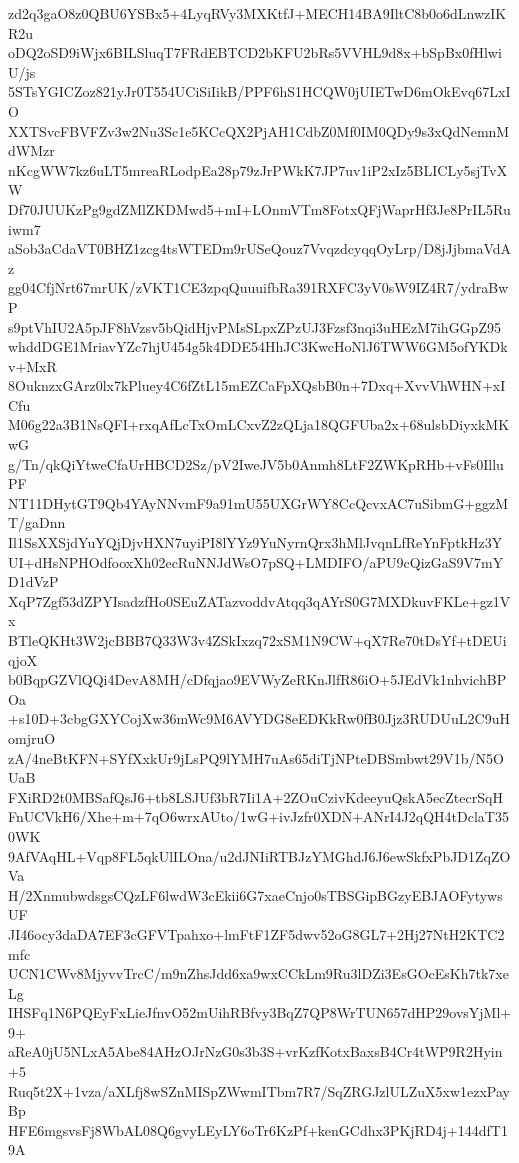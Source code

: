 zd2q3gaO8z0QBU6YSBx5+4LyqRVy3MXKtfJ+MECH14BA9IltC8b0o6dLnwzIKR2u
oDQ2oSD9iWjx6BILSluqT7FRdEBTCD2bKFU2bRs5VVHL9d8x+bSpBx0fHlwiU/js
5STsYGICZoz821yJr0T554UCiSiIikB/PPF6hS1HCQW0jUIETwD6mOkEvq67LxIO
XXTSvcFBVFZv3w2Nu3Sc1e5KCcQX2PjAH1CdbZ0Mf0IM0QDy9s3xQdNemnMdWMzr
nKcgWW7kz6uLT5mreaRLodpEa28p79zJrPWkK7JP7uv1iP2xIz5BLICLy5sjTvXW
Df70JUUKzPg9gdZMlZKDMwd5+mI+LOnmVTm8FotxQFjWaprHf3Je8PrIL5Ruiwm7
aSob3aCdaVT0BHZ1zcg4tsWTEDm9rUSeQouz7VvqzdcyqqOyLrp/D8jJjbmaVdAz
gg04CfjNrt67mrUK/zVKT1CE3zpqQuuuifbRa391RXFC3yV0sW9IZ4R7/ydraBwP
s9ptVhIU2A5pJF8hVzsv5bQidHjvPMsSLpxZPzUJ3Fzsf3nqi3uHEzM7ihGGpZ95
whddDGE1MriavYZc7hjU454g5k4DDE54HhJC3KwcHoNlJ6TWW6GM5ofYKDkv+MxR
8OuknzxGArz0lx7kPluey4C6fZtL15mEZCaFpXQsbB0n+7Dxq+XvvVhWHN+xICfu
M06g22a3B1NsQFI+rxqAfLcTxOmLCxvZ2zQLja18QGFUba2x+68ulsbDiyxkMKwG
g/Tn/qkQiYtweCfaUrHBCD2Sz/pV2IweJV5b0Anmh8LtF2ZWKpRHb+vFs0IlluPF
NT11DHytGT9Qb4YAyNNvmF9a91mU55UXGrWY8CcQcvxAC7uSibmG+ggzMT/gaDnn
Il1SsXXSjdYuYQjDjvHXN7uyiPI8lYYz9YuNyrnQrx3hMlJvqnLfReYnFptkHz3Y
UI+dHsNPHOdfooxXh02ecRuNNJdWsO7pSQ+LMDIFO/aPU9cQizGaS9V7mYD1dVzP
XqP7Zgf53dZPYIsadzfHo0SEuZATazvoddvAtqq3qAYrS0G7MXDkuvFKLe+gz1Vx
BTleQKHt3W2jcBBB7Q33W3v4ZSkIxzq72xSM1N9CW+qX7Re70tDsYf+tDEUiqjoX
b0BqpGZVlQQi4DevA8MH/cDfqjao9EVWyZeRKnJlfR86iO+5JEdVk1nhvichBPOa
+s10D+3cbgGXYCojXw36mWc9M6AVYDG8eEDKkRw0fB0Jjz3RUDUuL2C9uHomjruO
zA/4neBtKFN+SYfXxkUr9jLsPQ9lYMH7uAs65diTjNPteDBSmbwt29V1b/N5OUaB
FXiRD2t0MBSafQsJ6+tb8LSJUf3bR7Ii1A+2ZOuCzivKdeeyuQskA5ecZtecrSqH
FnUCVkH6/Xhe+m+7qO6wrxAUto/1wG+ivJzfr0XDN+ANrI4J2qQH4tDclaT350WK
9AfVAqHL+Vqp8FL5qkUlILOna/u2dJNIiRTBJzYMGhdJ6J6ewSkfxPbJD1ZqZOVa
H/2XnmubwdsgsCQzLF6lwdW3cEkii6G7xaeCnjo0sTBSGipBGzyEBJAOFytywsUF
JI46ocy3daDA7EF3cGFVTpahxo+lmFtF1ZF5dwv52oG8GL7+2Hj27NtH2KTC2mfc
UCN1CWv8MjyvvTrcC/m9nZhsJdd6xa9wxCCkLm9Ru3lDZi3EsGOcEsKh7tk7xeLg
IHSFq1N6PQEyFxLieJfnvO52mUihRBfvy3BqZ7QP8WrTUN657dHP29ovsYjMl+9+
aReA0jU5NLxA5Abe84AHzOJrNzG0s3b3S+vrKzfKotxBaxsB4Cr4tWP9R2Hyin+5
Ruq5t2X+1vza/aXLfj8wSZnMISpZWwmITbm7R7/SqZRGJzlULZuX5xw1ezxPayBp
HFE6mgsvsFj8WbAL08Q6gvyLEyLY6oTr6KzPf+kenGCdhx3PKjRD4j+144dfT19A
